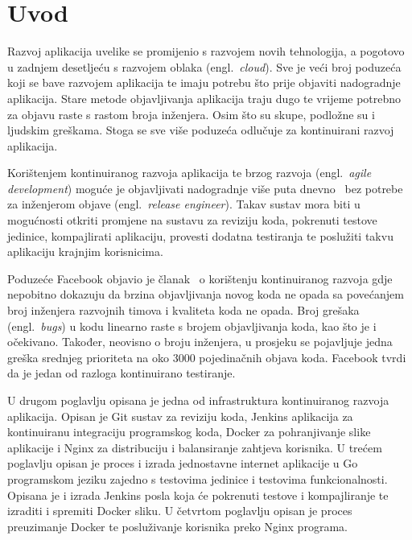 \chapter{Uvod}
Razvoj aplikacija uvelike se promijenio s razvojem novih tehnologija, a pogotovo u zadnjem desetljeću
s razvojem oblaka (engl.~\textit{cloud}). Sve je veći broj poduzeća koji se bave razvojem aplikacija
te imaju potrebu što prije objaviti nadogradnje aplikacija. Stare metode objavljivanja aplikacija
traju dugo te vrijeme potrebno za objavu raste s rastom broja inženjera. Osim što su skupe,
podložne su i ljudskim greškama. Stoga se sve više poduzeća odlučuje za kontinuirani razvoj
aplikacija.

Korištenjem kontinuiranog razvoja aplikacija te brzog razvoja (engl.~\textit{agile development})
moguće je objavljivati nadogradnje više puta dnevno~\citep{abrahamsson2017agile} bez potrebe za
inženjerom objave (engl.~\textit{release engineer}). Takav sustav mora biti u mogućnosti otkriti
promjene na sustavu za reviziju koda, pokrenuti testove jedinice, kompajlirati aplikaciju, provesti
dodatna testiranja te poslužiti takvu aplikaciju krajnjim korisnicima.

Poduzeće Facebook objavio je članak~\citep{rossi2016continuous} o korištenju kontinuiranog razvoja
gdje nepobitno dokazuju da brzina objavljivanja novog koda ne opada sa povećanjem broj inženjera
razvojnih timova i kvaliteta koda ne opada. Broj grešaka (engl.~\textit{bugs}) u kodu linearno raste
s brojem objavljivanja koda, kao što je i očekivano. Također, neovisno o broju inženjera, u
prosjeku se pojavljuje jedna greška srednjeg prioriteta na oko 3000 pojedinačnih objava koda.
Facebook tvrdi da je jedan od razloga kontinuirano testiranje.

U drugom poglavlju opisana je jedna od infrastruktura kontinuiranog razvoja aplikacija. Opisan je
Git sustav za reviziju koda, Jenkins aplikacija za kontinuiranu integraciju programskog koda,
Docker za pohranjivanje slike aplikacije i Nginx za distribuciju i balansiranje zahtjeva korisnika.
U trećem poglavlju opisan je proces i izrada jednostavne internet aplikacije u Go programskom jeziku
zajedno s testovima jedinice i testovima funkcionalnosti. Opisana je i izrada Jenkins posla koja će
pokrenuti testove i kompajliranje te izraditi i spremiti Docker sliku. U četvrtom poglavlju opisan
je proces preuzimanje Docker te posluživanje korisnika preko Nginx programa.

